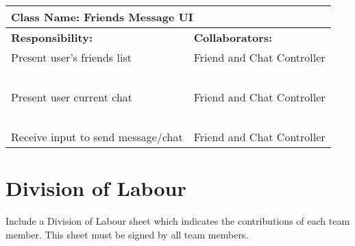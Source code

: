 \documentclass[]{article}
\begin{document}
\begin{table}[H]
    \centering
    \begin{tabular}{|p{5cm}|p{5cm}|}
        \hline
        \multicolumn{2}{|l|}{\textbf{Class Name:} Friends Message UI}\\
        \hline
        \textbf{Responsibility:} & \textbf{Collaborators:}\\
        \hline
        Present user’s friends list & Friend and Chat Controller\\
        ~ & ~\\
        Present user current chat & Friend and Chat Controller\\
        ~ & ~\\
        Receive input to send message/chat & Friend and Chat Controller\\
        \hline
    \end{tabular}
\end{table}

\newpage
\appendix
\section{Division of Labour}
\label{sec:division_of_labour}
Include a Division of Labour sheet which indicates the contributions of each team member. This sheet must be signed by all team members.

\newpage
\end{document}
